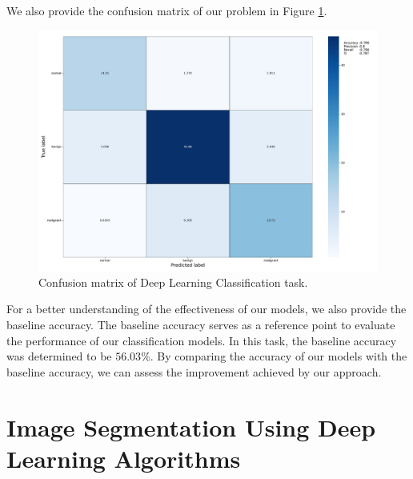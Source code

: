 We also provide the confusion matrix of our problem in Figure \ref{Figure - DL_Classification Confusion matrix}.
\begin{figure}
  \includegraphics[width=\linewidth]{Figures/Confusion_Matrix_DL_Classification.pdf}
  \caption{Confusion matrix of Deep Learning Classification task.}
  \label{Figure - DL_Classification Confusion matrix}
\end{figure}

For a better understanding of the effectiveness of our models, we also provide the baseline accuracy. The baseline accuracy serves as a reference point to evaluate the performance of our classification models. In this task, the baseline accuracy was determined to be $56.03\%$. By comparing the accuracy of our models with the baseline accuracy, we can assess the improvement achieved by our approach. 


\section{Image Segmentation Using Deep Learning Algorithms}


